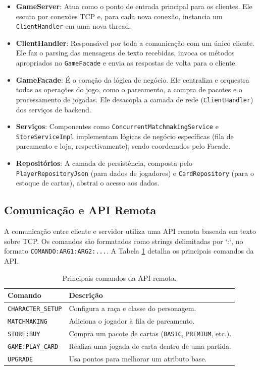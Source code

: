 \documentclass[12pt,a4paper]{article}
\begin{document}
\begin{itemize}
    \item \textbf{GameServer}: Atua como o ponto de entrada principal para os clientes. Ele escuta por conexões TCP e, para cada nova conexão, instancia um \texttt{ClientHandler} em uma nova thread.
    \item \textbf{ClientHandler}: Responsável por toda a comunicação com um único cliente. Ele faz o parsing das mensagens de texto recebidas, invoca os métodos apropriados no \texttt{GameFacade} e envia as respostas de volta para o cliente.
    \item \textbf{GameFacade}: É o coração da lógica de negócio. Ele centraliza e orquestra todas as operações do jogo, como o pareamento, a compra de pacotes e o processamento de jogadas. Ele desacopla a camada de rede (\texttt{ClientHandler}) dos serviços de backend.
    \item \textbf{Serviços}: Componentes como \texttt{ConcurrentMatchmakingService} e \texttt{StoreServiceImpl} implementam lógicas de negócio específicas (fila de pareamento e loja, respectivamente), sendo coordenados pelo Facade.
    \item \textbf{Repositórios}: A camada de persistência, composta pelo \texttt{PlayerRepositoryJson} (para dados de jogadores) e \texttt{CardRepository} (para o estoque de cartas), abstrai o acesso aos dados.
\end{itemize}

\subsection{Comunicação e API Remota}
A comunicação entre cliente e servidor utiliza uma API remota baseada em texto sobre TCP. Os comandos são formatados como strings delimitadas por `:`, no formato \texttt{COMANDO:ARG1:ARG2:...}. A Tabela \ref{tab:comandos} detalha os principais comandos da API.

\begin{table}[h!]
\centering
\caption{Principais comandos da API remota.}
\label{tab:comandos}
\begin{tabular}{ll}
\toprule
Comando & Descrição \\ \midrule
\texttt{CHARACTER\_SETUP} & Configura a raça e classe do personagem. \\
\texttt{MATCHMAKING} & Adiciona o jogador à fila de pareamento. \\
\texttt{STORE:BUY} & Compra um pacote de cartas (\texttt{BASIC}, \texttt{PREMIUM}, etc.). \\
\texttt{GAME:PLAY\_CARD} & Realiza uma jogada de carta dentro de uma partida. \\
\texttt{UPGRADE} & Usa pontos para melhorar um atributo base. \\
\bottomrule
\end{tabular}
\end{table}
\end{document}
